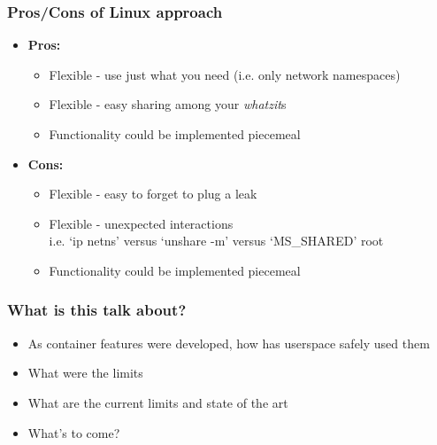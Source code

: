 \documentclass{beamer}
\begin{document}
\begin{frame}
\frametitle{Pros/Cons of Linux approach}
\begin{itemize}
  \item {\bf Pros:}
    \begin{itemize}
      \item Flexible - use just what you need (i.e. only network namespaces)
      \item Flexible - easy sharing among your {\em whatzit}s
      \item Functionality could be implemented piecemeal
    \end{itemize}
  \item {\bf Cons:}
    \begin{itemize}
      \item Flexible - easy to forget to plug a leak
      \item Flexible - unexpected interactions \\
        i.e. `ip netns' versus `unshare -m' versus `MS\_SHARED' root
      \item Functionality could be implemented piecemeal
    \end{itemize}
\end{itemize}

\end{frame}

\begin{frame}
\frametitle{What is this talk about?}
\pause
\begin{itemize}
  \item As container features were developed, how has userspace safely used them
  \item What were the limits
  \item What are the current limits and state of the art
  \item What's to come?
\end{itemize}

\end{frame}



\end{document}

